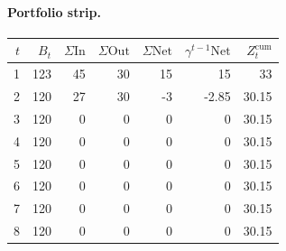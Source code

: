 \documentclass[12pt, a4paper]{article}
\begin{document}
\paragraph{Portfolio strip.}
\begin{center}
\begin{tabular}{rrrrrrr}
\toprule
$t$ & $B_t$ & $\Sigma\mathrm{In}$ & $\Sigma\mathrm{Out}$ & $\Sigma\mathrm{Net}$ & $\gamma^{t-1}\mathrm{Net}$ & $Z_t^{\mathrm{cum}}$\\
\midrule
1 & 123 & 45 & 30 & 15 & 15 & 33 \\
2 & 120 & 27 & 30 & -3 & -2.85 & 30.15 \\
3 & 120 & 0 & 0 & 0 & 0 & 30.15 \\
4 & 120 & 0 & 0 & 0 & 0 & 30.15 \\
5 & 120 & 0 & 0 & 0 & 0 & 30.15 \\
6 & 120 & 0 & 0 & 0 & 0 & 30.15 \\
7 & 120 & 0 & 0 & 0 & 0 & 30.15 \\
8 & 120 & 0 & 0 & 0 & 0 & 30.15 \\
\bottomrule
\end{tabular}
\end{center}
\end{document}

